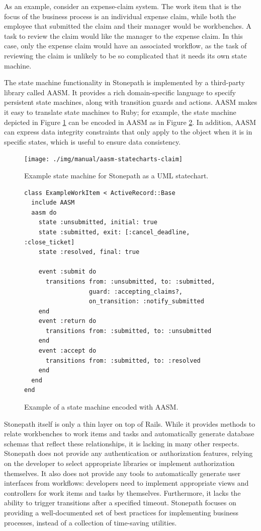 \documentclass[document.tex]{subfiles}
\begin{document}
As an example, consider an expense-claim system. The work item that is the focus of the business process is an individual expense claim, while both the employee that submitted the claim and their manager would be workbenches. A task to review the claim would like the manager to the expense claim. In this case, only the expense claim would have an associated workflow, as the task of reviewing the claim is unlikely to be so complicated that it needs its own state machine.

The state machine functionality in Stonepath is implemented by a third-party library called AASM. It provides a rich domain-specific language to specify persistent state machines, along with transition guards and actions.
AASM makes it easy to translate state machines to Ruby; for example, the state machine depicted in Figure \ref{fig:background-aasm-statemachine} can be encoded in AASM as in Figure \ref{fig:background-aasm-code}. In addition, AASM can express data integrity constraints that only apply to the object when it is in specific states, which is useful to ensure data consistency.

\begin{figure}[!ht]
  \centering
  \texttt{[image: ./img/manual/aasm-statecharts-claim]}
  \caption{Example state machine for Stonepath as a UML statechart.}
  \label{fig:background-aasm-statemachine}
\end{figure}

\begin{figure}[!ht]
  \begin{lstlisting}
class ExampleWorkItem < ActiveRecord::Base
  include AASM
  aasm do
    state :unsubmitted, initial: true
    state :submitted, exit: [:cancel_deadline, :close_ticket]
    state :resolved, final: true

    event :submit do
      transitions from: :unsubmitted, to: :submitted,
                  guard: :accepting_claims?,
                  on_transition: :notify_submitted
    end
    event :return do
      transitions from: :submitted, to: :unsubmitted
    end
    event :accept do
      transitions from: :submitted, to: :resolved
    end
  end
end
  \end{lstlisting}
  \caption{Example of a state machine encoded with AASM.}
  \label{fig:background-aasm-code}
\end{figure}

Stonepath itself is only a thin layer on top of Rails. While it provides methods to relate workbenches to work items and tasks and automatically generate database schemas that reflect these relationships, it is lacking in many other respects. Stonepath does not provide any authentication or authorization features, relying on the developer to select appropriate libraries or implement authorization themselves. It also does not provide any tools to automatically generate user interfaces from workflows: developers need to implement appropriate views and controllers for work items and tasks by themselves. Furthermore, it lacks the ability to trigger transitions after a specified timeout. Stonepath focuses on providing a well-documented set of best practices for implementing business processes, instead of a collection of time-saving utilities.
\end{document}
